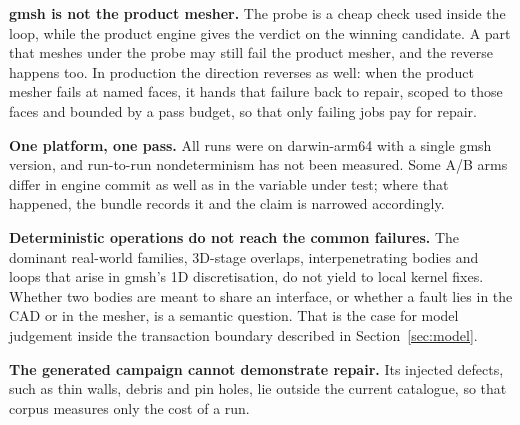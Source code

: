 \documentclass[10pt,onecolumn]{article}
\newcommand{\topic}[1]{\textbf{#1.}\hspace{0.5em}\ignorespaces}
\begin{document}
\topic{gmsh is not the product mesher} The probe is a cheap check used inside the loop, while the
product engine gives the verdict on the winning candidate. A part that meshes under the probe may
still fail the product mesher, and the reverse happens too. In production the direction reverses as well:
when the product mesher fails at named faces, it hands that failure back to repair, scoped to those
faces and bounded by a pass budget, so that only failing jobs pay for repair.

\topic{One platform, one pass} All runs were on darwin-arm64 with a single gmsh version, and
run-to-run nondeterminism has not been measured. Some A/B arms differ in engine commit as well as in
the variable under test; where that happened, the bundle records it and the claim is narrowed
accordingly.

\topic{Deterministic operations do not reach the common failures} The dominant real-world families,
3D-stage overlaps, interpenetrating bodies and loops that arise in gmsh's 1D discretisation, do not
yield to local kernel fixes. Whether two bodies are meant to share an interface, or whether a fault
lies in the CAD or in the mesher, is a semantic question. That is the case for model judgement
inside the transaction boundary described in Section~\ref{sec:model}.

\topic{The generated campaign cannot demonstrate repair} Its injected defects, such as thin walls,
debris and pin holes, lie outside the current catalogue, so that corpus measures only the cost of a
run.
\end{document}
